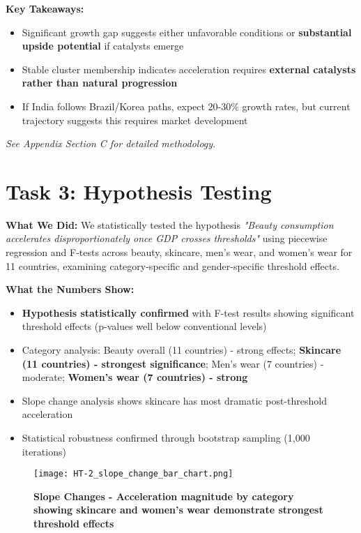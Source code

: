 \documentclass[11pt]{article}
\begin{document}
\textbf{Key Takeaways:}
\vspace{-5pt}
\begin{itemize}
    \setlength{\itemsep}{-2pt}
    \item Significant growth gap suggests either unfavorable conditions or \textbf{substantial upside potential} if catalysts emerge
    \item Stable cluster membership indicates acceleration requires \textbf{external catalysts rather than natural progression}
    \item If India follows Brazil/Korea paths, expect 20-30\% growth rates, but current trajectory suggests this requires market development
\end{itemize}
\textit{See Appendix Section C for detailed methodology.}

\section{Task 3: Hypothesis Testing}

\textbf{What We Did:} We statistically tested the hypothesis \textit{"Beauty consumption accelerates disproportionately once GDP crosses thresholds"} using piecewise regression and F-tests across beauty, skincare, men's wear, and women's wear for 11 countries, examining category-specific and gender-specific threshold effects.

\textbf{What the Numbers Show:}
\vspace{-5pt}
\begin{itemize}
    \setlength{\itemsep}{-2pt}
    \item \textbf{Hypothesis statistically confirmed} with F-test results showing significant threshold effects (p-values well below conventional levels)
    \item Category analysis: Beauty overall (11 countries) - strong effects; \textbf{Skincare (11 countries) - strongest significance}; Men's wear (7 countries) - moderate; \textbf{Women's wear (7 countries) - strong}
    \item Slope change analysis shows skincare has most dramatic post-threshold acceleration
    \item Statistical robustness confirmed through bootstrap sampling (1,000 iterations)
\end{itemize}

\begin{figure}[H]
\centering
\texttt{[image: HT-2\_slope\_change\_bar\_chart.png]}
\caption{\textbf{Slope Changes - Acceleration magnitude by category showing skincare and women's wear demonstrate strongest threshold effects}}
\end{figure}
\end{document}
